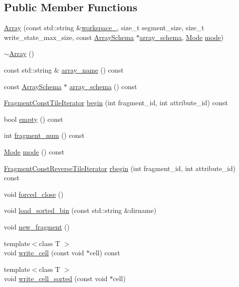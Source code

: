 \subsection*{Public Member Functions}
\begin{DoxyCompactItemize}
\item 
\hyperlink{classArray_a78d192171fb11d5c5d0eb2286aa33254}{Array} (const std\+::string \&\hyperlink{classArray_acb0d651fc80fd7a93a1aafdaa62c87c2}{workspace\+\_\+}, size\+\_\+t segment\+\_\+size, size\+\_\+t write\+\_\+state\+\_\+max\+\_\+size, const \hyperlink{classArraySchema}{Array\+Schema} $\ast$\hyperlink{classArray_a2620b5f2a0589152cd40a572cb024882}{array\+\_\+schema}, \hyperlink{classArray_af5ea7849b92677a1f529cdb76b501920}{Mode} \hyperlink{classArray_a6db0cf2fd1ceabc515cfa80200fd7115}{mode})
\item 
\hyperlink{classArray_abcabe567f41f7798d2f97babcc443c6f}{$\sim$\+Array} ()
\item 
const std\+::string \& \hyperlink{classArray_a3bbcf58081814c5ba81c98c1ba129613}{array\+\_\+name} () const 
\item 
const \hyperlink{classArraySchema}{Array\+Schema} $\ast$ \hyperlink{classArray_a2620b5f2a0589152cd40a572cb024882}{array\+\_\+schema} () const 
\item 
\hyperlink{classFragmentConstTileIterator}{Fragment\+Const\+Tile\+Iterator} \hyperlink{classArray_a387dd4144dbdeb204a807dfbf1ba13f8}{begin} (int fragment\+\_\+id, int attribute\+\_\+id) const 
\item 
bool \hyperlink{classArray_a1dcfc87abd6697a58232bc8120de4385}{empty} () const 
\item 
int \hyperlink{classArray_abbf39141c9be35640d7c96a1cdf6d5eb}{fragment\+\_\+num} () const 
\item 
\hyperlink{classArray_af5ea7849b92677a1f529cdb76b501920}{Mode} \hyperlink{classArray_a6db0cf2fd1ceabc515cfa80200fd7115}{mode} () const 
\item 
\hyperlink{classFragmentConstReverseTileIterator}{Fragment\+Const\+Reverse\+Tile\+Iterator} \hyperlink{classArray_a98780428d3500e43908d59d7b3ec09a6}{rbegin} (int fragment\+\_\+id, int attribute\+\_\+id) const 
\item 
void \hyperlink{classArray_aaedb3d538280ca93eb5fc28ebbb39fbb}{forced\+\_\+close} ()
\item 
void \hyperlink{classArray_ab748d2d74259d81ee5a3d6a0e4d74b5d}{load\+\_\+sorted\+\_\+bin} (const std\+::string \&dirname)
\item 
void \hyperlink{classArray_a70bbff1757a35ef65ac07153574858da}{new\+\_\+fragment} ()
\item 
{\footnotesize template$<$class T $>$ }\\void \hyperlink{classArray_a6c0376397c2137f9496c3953ce5d4b73}{write\+\_\+cell} (const void $\ast$cell) const 
\item 
{\footnotesize template$<$class T $>$ }\\void \hyperlink{classArray_a7d46705ad09b99f05a3db41675baf988}{write\+\_\+cell\+\_\+sorted} (const void $\ast$cell)
\end{DoxyCompactItemize}
